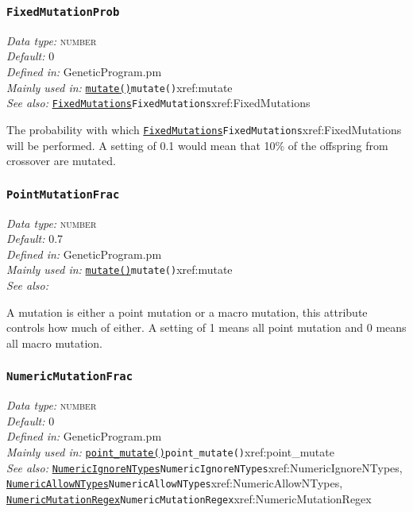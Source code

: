 \documentclass[a4paper]{article}
\begin{document}
\subsubsection{\texttt{FixedMutationProb}}\label{xref:FixedMutationProb}
\begin{flushleft}
\textit{Data type:} \textsc{number}\\
\textit{Default:} 0\\
\textit{Defined in:} GeneticProgram.pm\\
\textit{Mainly used in:} \hyperref[no]{\texttt{mutate()}}{\texttt{mutate()}}{xref:mutate}\\
\textit{See also:} \hyperref[no]{\texttt{FixedMutations}}{\texttt{FixedMutations}}{xref:FixedMutations}
\end{flushleft}

The probability with which \hyperref[no]{\texttt{FixedMutations}}{\texttt{FixedMutations}}{xref:FixedMutations} will be performed.
A setting of 0.1 would mean that 10\% of the offspring from crossover
are mutated.

\subsubsection{\texttt{PointMutationFrac}}\label{xref:PointMutationFrac}
\begin{flushleft}
\textit{Data type:} \textsc{number}\\
\textit{Default:} 0.7\\
\textit{Defined in:} GeneticProgram.pm\\
\textit{Mainly used in:} \hyperref[no]{\texttt{mutate()}}{\texttt{mutate()}}{xref:mutate}\\
\textit{See also:}
\end{flushleft}

A mutation is either a point mutation or a macro mutation, this attribute
controls how much of either.  A setting of 1 means all point mutation
and 0 means all macro mutation.

\subsubsection{\texttt{NumericMutationFrac}}\label{xref:NumericMutationFrac}
\begin{flushleft}
\textit{Data type:} \textsc{number}\\
\textit{Default:} 0\\
\textit{Defined in:} GeneticProgram.pm\\
\textit{Mainly used in:} \hyperref[no]{\texttt{point\_mutate()}}{\texttt{point\_mutate()}}{xref:point_mutate}\\
\textit{See also:} \hyperref[no]{\texttt{NumericIgnoreNTypes}}{\texttt{NumericIgnoreNTypes}}{xref:NumericIgnoreNTypes}, \hyperref[no]{\texttt{NumericAllowNTypes}}{\texttt{NumericAllowNTypes}}{xref:NumericAllowNTypes}, \hyperref[no]{\texttt{NumericMutationRegex}}{\texttt{NumericMutationRegex}}{xref:NumericMutationRegex}
\end{flushleft}
\end{document}
